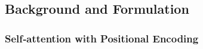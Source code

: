 

\subsection{Background and Formulation}
\subsubsection{Self‑attention with Positional Encoding}
\label{sec:prelim-sa}

